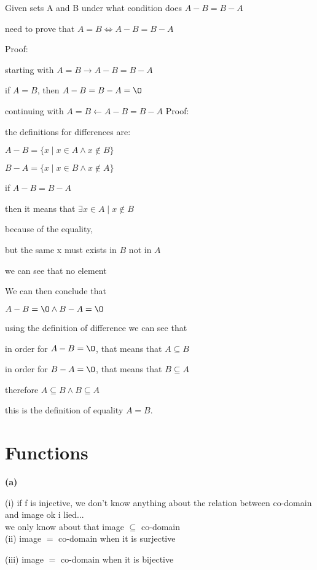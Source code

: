 \documentclass[12pts,A4]{article}
\begin{document}
\begin{flushleft}
    Given sets A and B under what condition does $A-B= B-A$ 

    need to prove that $ A=B \iff A-B = B-A $
    

    \bigskip
    Proof:


    starting with $A=B \rightarrow A-B = B-A $
    
    if $A=B$, then $A-B = B-A = \O$
    
    
    \bigskip

    continuing with $A=B \leftarrow A-B = B-A$
    \bigskip
    Proof:
        
        the definitions for differences are:

        \smallskip
        $ A-B = \{x \mid x \in A \wedge x \not\in B\}$

        \smallskip

        $ B-A = \{x \mid x \in B \wedge x \not\in A\}$

        if $A-B = B-A$

        then it means that $\exists x \in A \mid x \not\in B$
        
        because of the equality,


        but the same x must exists in $B$ not in $A$

        we can see that no element 
        
        We can then conclude that

        $A - B = \O \wedge  B- A = \O$

        using the definition of difference we can see that

        in order for $A - B = \O$, that means that $A \subseteq B$
        
        in order for $B - A = \O$, that means that $B \subseteq A$
        
        \bigskip 
        therefore $A \subseteq B \wedge B \subseteq A$

        this is the definition of equality $A = B$.




        

\end{flushleft}


\section{Functions}

\begin{flushleft}
    \textbf{(a)}

    (i) if f is injective, we don't know anything about the relation between co-domain and image
    ok i lied... \\ 
    we only know about that image $\subseteq$ co-domain\\
    
    (ii) image $=$ co-domain when it is surjective

    (iii) image $=$ co-domain when it is bijective 
    
     
\end{flushleft}
\end{document}
